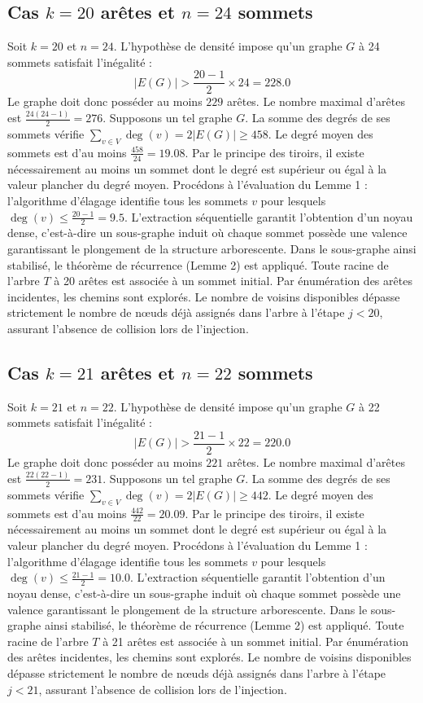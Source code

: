 \documentclass[12pt,a4paper]{article}
\begin{document}
\subsection{Cas $k = 20$ arêtes et $n = 24$ sommets}
Soit $k = 20$ et $n = 24$. L'hypothèse de densité impose qu'un graphe $G$ à 24 sommets satisfait l'inégalité :
$$ |E(G)| > \frac{20-1}{2} \times 24 = 228.0 $$
Le graphe doit donc posséder au moins $229$ arêtes. Le nombre maximal d'arêtes est $\frac{24(24-1)}{2} = 276$.
Supposons un tel graphe $G$. La somme des degrés de ses sommets vérifie $\sum_{v \in V} \deg(v) = 2|E(G)| \geq 458$.
Le degré moyen des sommets est d'au moins $\frac{458}{24} = 19.08$.
Par le principe des tiroirs, il existe nécessairement au moins un sommet dont le degré est supérieur ou égal à la valeur plancher du degré moyen.
Procédons à l'évaluation du Lemme 1 : l'algorithme d'élagage identifie tous les sommets $v$ pour lesquels $\deg(v) \leq \frac{20-1}{2} = 9.5$.
L'extraction séquentielle garantit l'obtention d'un noyau dense, c'est-à-dire un sous-graphe induit où chaque sommet possède une valence garantissant le plongement de la structure arborescente.
Dans le sous-graphe ainsi stabilisé, le théorème de récurrence (Lemme 2) est appliqué. Toute racine de l'arbre $T$ à 20 arêtes est associée à un sommet initial. Par énumération des arêtes incidentes, les chemins sont explorés. Le nombre de voisins disponibles dépasse strictement le nombre de nœuds déjà assignés dans l'arbre à l'étape $j < 20$, assurant l'absence de collision lors de l'injection.

\subsection{Cas $k = 21$ arêtes et $n = 22$ sommets}
Soit $k = 21$ et $n = 22$. L'hypothèse de densité impose qu'un graphe $G$ à 22 sommets satisfait l'inégalité :
$$ |E(G)| > \frac{21-1}{2} \times 22 = 220.0 $$
Le graphe doit donc posséder au moins $221$ arêtes. Le nombre maximal d'arêtes est $\frac{22(22-1)}{2} = 231$.
Supposons un tel graphe $G$. La somme des degrés de ses sommets vérifie $\sum_{v \in V} \deg(v) = 2|E(G)| \geq 442$.
Le degré moyen des sommets est d'au moins $\frac{442}{22} = 20.09$.
Par le principe des tiroirs, il existe nécessairement au moins un sommet dont le degré est supérieur ou égal à la valeur plancher du degré moyen.
Procédons à l'évaluation du Lemme 1 : l'algorithme d'élagage identifie tous les sommets $v$ pour lesquels $\deg(v) \leq \frac{21-1}{2} = 10.0$.
L'extraction séquentielle garantit l'obtention d'un noyau dense, c'est-à-dire un sous-graphe induit où chaque sommet possède une valence garantissant le plongement de la structure arborescente.
Dans le sous-graphe ainsi stabilisé, le théorème de récurrence (Lemme 2) est appliqué. Toute racine de l'arbre $T$ à 21 arêtes est associée à un sommet initial. Par énumération des arêtes incidentes, les chemins sont explorés. Le nombre de voisins disponibles dépasse strictement le nombre de nœuds déjà assignés dans l'arbre à l'étape $j < 21$, assurant l'absence de collision lors de l'injection.
\end{document}
